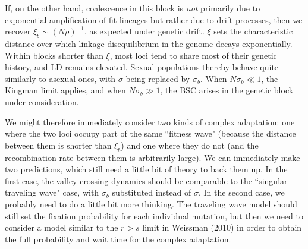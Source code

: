 \documentclass[10pt]{revtex4}
\begin{document}
If, on the other hand, coalescence in this block is \emph{not} primarily due to exponential amplification of fit lineages but rather due to drift processes, then we recover $\xi_b \sim (N\rho)^{-1}$, as expected under genetic drift.
$\xi$ sets the characteristic distance over which linkage disequilibrium in the genome decays exponentially.
Within blocks shorter than $\xi$, most loci tend to share most of their genetic history, and LD remains elevated.
Sexual populations thereby behave quite similarly to asexual ones, with $\sigma$ being replaced by $\sigma_b$.
When $N\sigma_b \ll 1$, the Kingman limit applies, and when $N\sigma_b \gg 1$, the BSC arises in the genetic block under consideration.

We might therefore immediately consider two kinds of complex adaptation: one where the two loci occupy part of the same ``fitness wave" (because the distance between them is shorter than $\xi_b$) and one where they do not (and the recombination rate between them is arbitrarily large).
We can immediately make two predictions, which still need a little bit of theory to back them up.
In the first case, the valley crossing dynamics should be comparable to the ``singular traveling wave" case, with $\sigma_b$ substituted instead of $\sigma$.
In the second case, we probably need to do a little bit more thinking.
The traveling wave model should still set the fixation probability for each individual mutation, but then we need to consider a model similar to the $r > s$ limit in Weissman (2010) in order to obtain the full probability and wait time for the complex adaptation.
\end{document}
